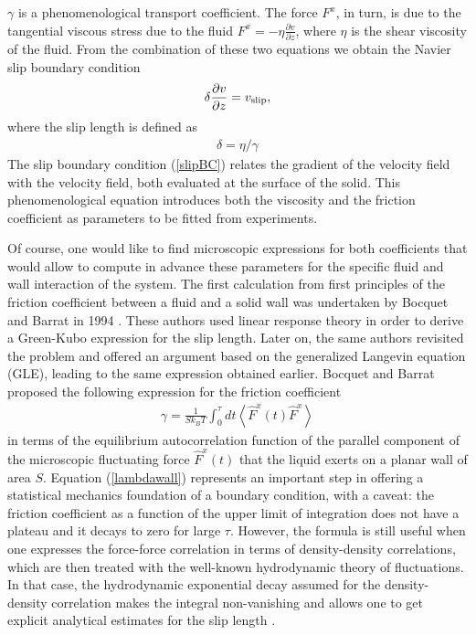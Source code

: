 \documentclass[b5paper,openright,10pt]{book}
\newcommand{\llangle}{\left\langle}
\newcommand{\rrangle}{\right\rangle}
\begin{document}
$\gamma$ is a phenomenological transport coefficient.  The
force $F^x$, in  turn, is due to the tangential  viscous stress due to
the fluid  $F^x=-\eta \frac{\partial  v}{\partial z}$, where  $\eta$ is
the shear  viscosity of the fluid.  From the combination of  these two
equations we obtain the Navier slip boundary condition
\begin{align}
  \delta  \frac{\partial v}{\partial z}=v_{\rm slip},
\label{slipBC}
\end{align}
where the slip length  is defined as
\begin{align}
  \delta=\eta/\gamma
\end{align}
The slip boundary condition (\ref{slipBC}) relates the gradient of the
velocity field with the velocity  field, both evaluated at the surface
of  the solid.   This  phenomenological equation  introduces both  the
viscosity and the friction coefficient as parameters to be fitted from
experiments. 

Of course,  one would  like to find  microscopic expressions  for both
coefficients that would  allow to compute in  advance these parameters
for the specific fluid and wall  interaction of the system.  The first
calculation from first principles  of the friction coefficient between
a fluid and a solid wall was  undertaken by Bocquet and Barrat in 1994
\cite{Bocquet1994}. These  authors used
linear  response  theory   in   order  to  derive  a  Green-Kubo
expression  for the  slip length.   Later  on, the  same authors  
revisited the problem and offered an argument based on the generalized
Langevin  equation  (GLE), leading  to  the  same expression  obtained
earlier\cite{Bocquet2013}.  Bocquet and Barrat proposed the following  expression for
the friction coefficient
\begin{align}
  \gamma=\frac{1}{Sk_BT}\int_0^{\tau} dt \llangle \hat{F}^x(t)\hat{F}^x\rrangle
\label{lambdawall}
\end{align}
in terms of  the equilibrium autocorrelation function  of the parallel
component of the microscopic fluctuating force $\hat{F}^x(t)$ that the
liquid exerts on  a planar wall of area  $S$.  Equation  (\ref{lambdawall})
represents  an  important step  in  offering  a statistical  mechanics
foundation  of  a boundary  condition,  with  a caveat:  the  friction
coefficient as a  function of the upper limit of  integration does not
have a plateau  and it decays to zero for  large $\tau$. 
However, the
formula is still useful when one expresses the force-force correlation
in terms of density-density correlations,  which are then treated with
the well-known hydrodynamic theory of fluctuations.  In that case, the
hydrodynamic  exponential   decay  assumed  for   the  density-density
correlation makes  the integral  non-vanishing and  allows one  to get
explicit     analytical    estimates     for    the     slip    length
\cite{Barrat1999,Bocquet2007,Kobryn2008,Kobryn2011}.
\end{document}
